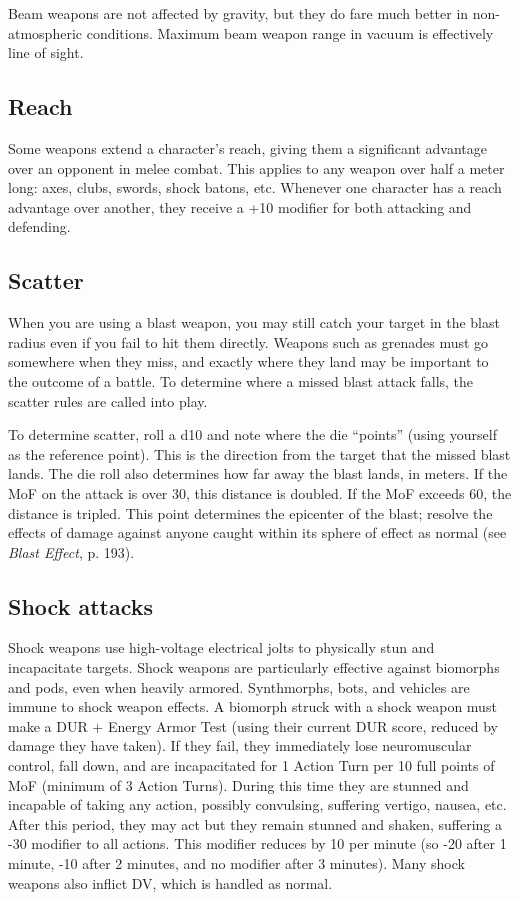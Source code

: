Beam weapons are not affected by gravity, but they do fare much better in non-atmospheric conditions. Maximum beam weapon range in vacuum is effectively line of sight.


\subsection{Reach}
\label{sec:reach}

Some weapons extend a character’s reach, giving them a significant advantage over an opponent in melee combat. This applies to any weapon over half a meter long: axes, clubs, swords, shock batons, etc. Whenever one character has a reach advantage over another, they receive a +10 modifier for both attacking and defending.


\subsection{Scatter}
\label{sec:scatter}

When you are using a blast weapon, you may still catch your target in the blast radius even if you fail to hit them directly. Weapons such as grenades must go somewhere when they miss, and exactly where they land may be important to the outcome of a battle. To determine where a missed blast attack falls, the scatter rules are called into play.

To determine scatter, roll a d10 and note where the die ``points'' (using yourself as the reference point). This is the direction from the target that the missed blast lands. The die roll also determines how far away the blast lands, in meters. If the MoF on the attack is over 30, this distance is doubled. If the MoF exceeds 60, the distance is tripled. This point determines the epicenter of the blast; resolve the effects of damage against anyone caught within its sphere of effect as normal (see \emph{Blast Effect}, p. 193).


\subsection{Shock attacks}
\label{sec:shock-attacks}

Shock weapons use high-voltage electrical jolts to physically stun and incapacitate targets. Shock weapons are particularly effective against biomorphs and pods, even when heavily armored. Synthmorphs, bots, and vehicles are immune to shock weapon effects. A biomorph struck with a shock weapon must make a DUR + Energy Armor Test (using their current DUR score, reduced by damage they have taken). If they fail, they immediately lose neuromuscular control, fall down, and are incapacitated for 1 Action Turn per 10 full points of MoF (minimum of 3 Action Turns). During this time they are stunned and incapable of taking any action, possibly convulsing, suffering vertigo, nausea, etc. After this period, they may act but they remain stunned and shaken, suffering a -30 modifier to all actions. This modifier reduces by 10 per minute (so -20 after 1 minute, -10 after 2 minutes, and no modifier after 3 minutes). Many shock weapons also inflict DV, which is handled as normal.


